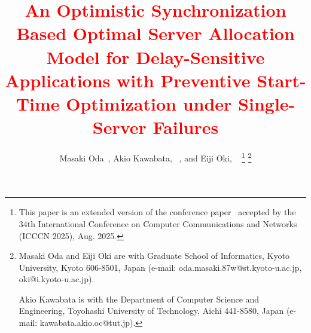 \documentclass[10pt, letterpaper]{IEEEtran}
\newcommand\red[1]{\textcolor{red}{#1}}
\begin{document}
\begin{CJK}{UTF8}{ipxm}

\title{\huge \red{An Optimistic Synchronization Based Optimal Server Allocation Model for Delay-Sensitive Applications with Preventive Start-Time Optimization under Single-Server Failures}}

\author{Masaki Oda~, Akio Kawabata, ~, and Eiji Oki, ~
\thanks{This paper is an extended version of the conference paper~\cite{Oda_ICCCN2025} accepted by the 34th International Conference on Computer Communications and Networks (ICCCN 2025), Aug. 2025.}
\thanks{Masaki Oda and Eiji Oki are with Graduate School of Informatics, Kyoto University, Kyoto 606-8501, Japan (e-mail: oda.masaki.87w@st.kyoto-u.ac.jp, oki@i.kyoto-u.ac.jp).

Akio Kawabata is with the Department of Computer Science and Engineering, Toyohashi University of Technology, Aichi 441-8580, Japan
(e-mail: kawabata.akio.oc@tut.jp).}
}
\maketitle


\end{CJK}
\end{document}
